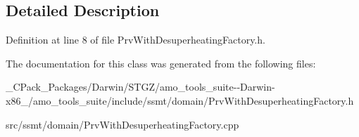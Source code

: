 \subsection{Detailed Description}


Definition at line 8 of file Prv\+With\+Desuperheating\+Factory.\+h.



The documentation for this class was generated from the following files\+:\begin{DoxyCompactItemize}
\item 
\+\_\+\+C\+Pack\+\_\+\+Packages/\+Darwin/\+S\+T\+G\+Z/amo\+\_\+tools\+\_\+suite-\/-\/\+Darwin-\/x86\+\_/amo\+\_\+tools\+\_\+suite/include/ssmt/domain/Prv\+With\+Desuperheating\+Factory.\+h\item 
src/ssmt/domain/Prv\+With\+Desuperheating\+Factory.\+cpp\end{DoxyCompactItemize}
